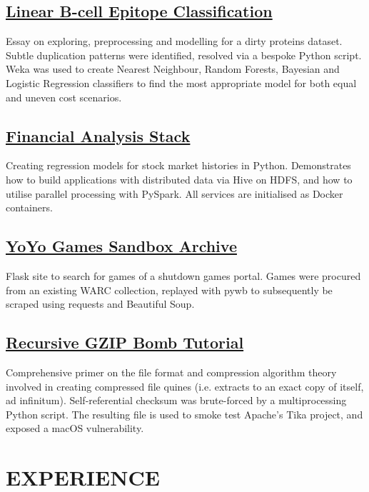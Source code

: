 \documentclass[11pt]{article}
\newcommand{\tech}[1]{#1}
\begin{document}
\subsection*{\href{https://github.com/Honno/epitope-classification}{Linear B-cell Epitope Classification}}

Essay on exploring, preprocessing and modelling for a dirty proteins dataset. Subtle duplication patterns  were identified, resolved via a bespoke \tech{Python} script. \tech{Weka} was used to create Nearest Neighbour, Random Forests, Bayesian and Logistic Regression classifiers to find the most appropriate model for both equal and uneven cost scenarios.

\subsection*{\href{https://github.com/Joshgallagher/financial-analysis-stack}{Financial Analysis Stack}}

Creating regression models for stock market histories in \tech{Python}. Demonstrates how to build applications with distributed data via \tech{Hive} on \tech{HDFS}, and how to utilise parallel processing with \tech{PySpark}. All services are initialised as \tech{Docker} containers.

\subsection*{\href{https://www.yygarchive.org/}{YoYo Games Sandbox Archive}}

\tech{Flask} site to search for games of a shutdown games portal. Games were procured from an existing \tech{WARC} collection, replayed with \tech{pywb} to subsequently be scraped using \tech{requests} and \tech{Beautiful Soup}.

\subsection*{\href{https://matthewbarber.io/gzip-quine/}{Recursive GZIP Bomb Tutorial}}

Comprehensive primer on the file format and compression algorithm theory involved in creating compressed file quines (i.e. extracts to an exact copy of itself, ad infinitum). Self-referential checksum was brute-forced by a multiprocessing \tech{Python} script. The resulting file is used to smoke test Apache's Tika project, and exposed a macOS vulnerability.

\section*{EXPERIENCE}
\end{document}
